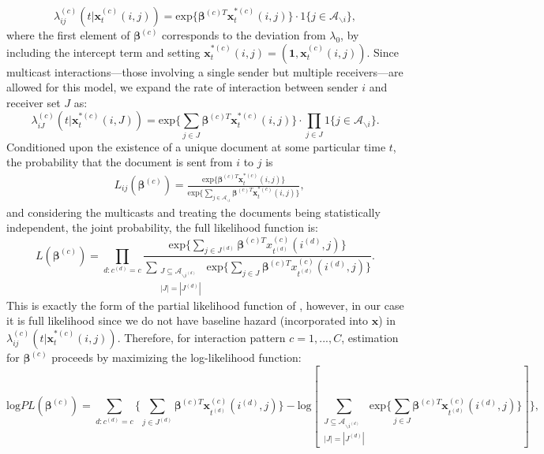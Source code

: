 \documentclass[a4paper]{article}
\begin{document}
\begin{equation}
\lambda^{(c)}_{ij}(t|\boldsymbol{x}_t^{(c)}(i, j))= \mbox{exp}\Big\{\boldsymbol{\beta}^{(c)T}\boldsymbol{x}^{*(c)}_t(i, j)\Big\}\cdot 1\{j \in \mathcal{A}_{\backslash i}\},
\end{equation}
where the first element of $\boldsymbol{\beta}^{(c)}$ corresponds to the deviation from $\lambda_0$, by including the intercept term and setting $\boldsymbol{x}^{*(c)}_t(i, j)=(\boldsymbol{1}, \boldsymbol{x}^{(c)}_t(i, j))$. Since multicast interactions—those involving a single sender but multiple
receivers—are allowed for this model, we expand the rate of interaction between sender $i$ and receiver set $J$ as:
\begin{equation}
\lambda^{(c)}_{iJ}(t|\boldsymbol{x}_t^{*(c)}(i, J))= \mbox{exp}\Big\{\sum\limits_{j \in J} \boldsymbol{\beta}^{(c)T}\boldsymbol{x}^{*(c)}_t(i, j)\Big\}\cdot \prod\limits_{j \in J}1\{j \in \mathcal{A}_{\backslash i}\}.
\end{equation}
Conditioned upon the existence of a unique document at some particular time $t$, the probability that the document is sent from $i$ to $j$ is
	\begin{align*}
	&L_{ij}(\boldsymbol{\beta}^{(c)}) = \frac{\mbox{exp}\Big\{ \boldsymbol{\beta}^{(c)T}\boldsymbol{x}^{*(c)}_t(i, j)\Big\}}{\mbox{exp}\Big\{\sum\limits_{j \in \mathcal{A}_{\backslash i}} \boldsymbol{\beta}^{(c)T}\boldsymbol{x}^{*(c)}_t(i, j)\Big\}},
	\end{align*}
and considering the multicasts and treating the documents being statistically independent, the joint probability, the full likelihood function is:
\begin{equation}
L(\boldsymbol{\beta}^{(c)})=\prod_{d: c^{(d)}=c} \frac{\mbox{exp}\{\sum\limits_{j \in J^{(d)}} \boldsymbol{\beta}^{(c)T}x^{(c)}_{t^{(d)}}(i^{(d)}, j)\}}{\sum\limits_{\substack{J \subseteq \mathcal{A}_{\backslash i^{(d)}} \\|J|=|J^{(d)}|}} \mbox{exp}\{\sum\limits_{j \in J} \boldsymbol{\beta}^{(c)T}x^{(c)}_{t^{(d)}}(i^{(d)}, j)\}}.
\end{equation}
This is exactly the form of the partial likelihood function of \cite{cox1992regression}, however, in our case it is full likelihood since we do not have baseline hazard (incorporated into $\boldsymbol{x}$) in $\lambda^{(c)}_{ij}(t|\boldsymbol{x}_t^{*(c)}(i, j))$. Therefore, for interaction pattern $c=1,...,C$, estimation for $\boldsymbol{\beta}^{(c)}$ proceeds by maximizing the log-likelihood function: 
\begin{equation}
\mbox{log}PL(\boldsymbol{\beta}^{(c)})=\sum_{d: c^{(d)}=c} \Big\{\sum\limits_{j \in J^{(d)}} \boldsymbol{\beta}^{(c)T}\boldsymbol{x}^{(c)}_{t^{(d)}}(i^{(d)}, j)\}-\mbox{log}[{\sum\limits_{\substack{J \subseteq \mathcal{A}_{\backslash i^{(d)}} \\|J|=|J^{(d)}|}} \mbox{exp}\{\sum\limits_{j \in J} \boldsymbol{\beta}^{(c)T}\boldsymbol{x}^{(c)}_{t^{(d)}}(i^{(d)}, j)\}}]\Big\},
\end{equation}
\end{document}
